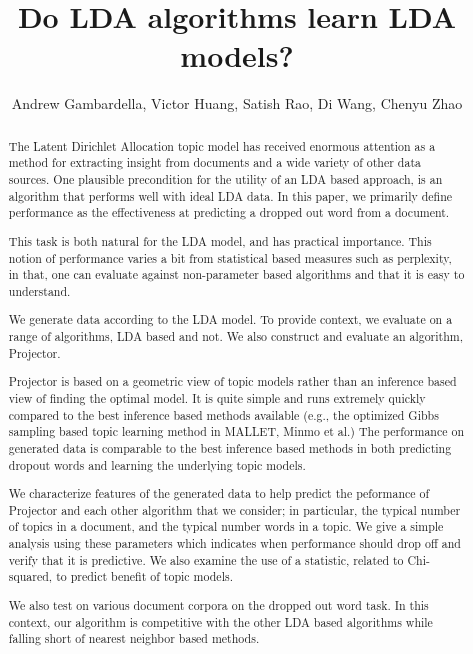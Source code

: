 \documentclass{article}
\title{Do LDA algorithms learn LDA models? }
\author{Andrew Gambardella, Victor Huang, Satish Rao, Di Wang, Chenyu Zhao}
\date{}
\begin{document}
\maketitle

\begin{abstract}

The Latent Dirichlet Allocation topic model has received enormous
attention as a method for extracting insight from documents and a wide
variety of other data sources.  One plausible precondition for the
utility of an LDA based approach, is an algorithm that performs well
with ideal LDA data.  In this paper, we primarily define performance
as the effectiveness at predicting a dropped out word from a
document. 

This task is both natural for the LDA model, and has
practical importance. This notion of performance varies a bit
from statistical based measures such as perplexity, in that,
one can evaluate against non-parameter based algorithms and
that it is easy to understand. 

We generate data according to the LDA model. To provide context, we
evaluate on a range of algorithms, LDA based and not. We also
construct and evaluate an algorithm, Projector.

Projector is based on a geometric view of topic models rather than an
inference based view of finding the optimal model.  It is quite simple
and runs extremely quickly compared to the best inference based
methods available (e.g., the optimized Gibbs sampling based topic
learning method in MALLET, Minmo et al.)  The performance on generated
data is comparable to the best inference based methods in both
predicting dropout words and learning the underlying topic models.

We characterize features of the generated data to help predict the
peformance of Projector and each other algorithm that we consider; in
particular, the typical number of topics in a document, and the typical
number words in a topic.  We give a simple analysis using these
parameters which indicates when performance should drop off and verify
that it is predictive.  We also examine the use of a statistic,
related to Chi-squared, to predict benefit of topic models.

We also test on various document corpora on the dropped out 
word task. In this context, our algorithm is competitive with the other
LDA based algorithms while falling short of nearest neighbor
based methods.


\end{abstract}
\end{document}
